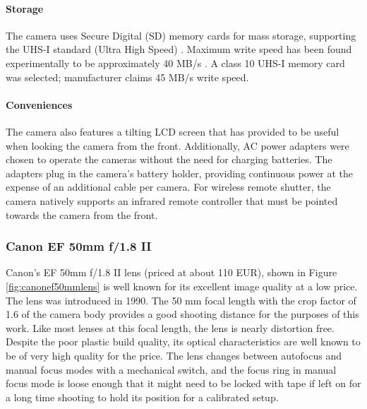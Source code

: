\paragraph{Storage}
The camera uses Secure Digital (SD) memory cards for mass storage, supporting the UHS-I standard (Ultra High Speed) \cite{sdcardspeed}.
Maximum write speed has been found experimentally to be approximately 40 MB/s \cite{magiclanternforum}.
A class 10 UHS-I memory card was selected; manufacturer claims 45 MB/s write speed.

\paragraph{Conveniences}
The camera also features a tilting LCD screen that has provided to be useful when looking the camera from the front.
Additionally, AC power adapters were chosen to operate the cameras without the need for charging batteries.
The adapters plug in the camera's battery holder, providing continuous power at the expense of an additional cable per camera.
For wireless remote shutter, the camera natively supports an infrared remote controller that must be pointed towards the camera from the front.


\subsubsection{Canon EF 50mm f/1.8 II}

Canon's EF 50mm f/1.8 II lens (priced at about 110 EUR), shown in Figure \ref{fig:canonef50mmlens} is well known for its excellent image quality at a low price.
The lens was introduced in 1990.
The 50 mm focal length with the crop factor of 1.6 of the camera body provides a good shooting distance for the purposes of this work.
Like most lenses at this focal length, the lens is nearly distortion free.
Despite the poor plastic build quality, its optical characteristics are well known to be of very high quality for the price.
The lens changes between autofocus and manual focus modes with a mechanical switch, and the focus ring in manual focus mode is loose enough that it might need to be locked with tape if left on for a long time shooting to hold its position for a calibrated setup.

